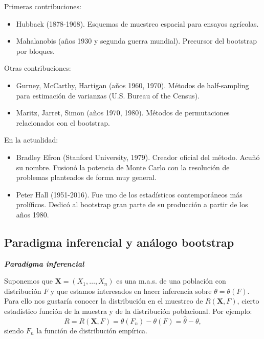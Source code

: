 \documentclass[]{book}
\theoremstyle{definition}
\theoremstyle{definition}
\theoremstyle{definition}
\theoremstyle{remark}
\begin{document}
Primeras contribuciones:

\begin{itemize}
\item
  Hubback (1878-1968). Esquemas de muestreo espacial para ensayos
  agrícolas.
\item
  Mahalanobis (años 1930 y segunda guerra mundial). Precursor del
  bootstrap por bloques.
\end{itemize}

Otras contribuciones:

\begin{itemize}
\item
  Gurney, McCarthy, Hartigan (años 1960, 1970). Métodos de half-sampling
  para estimación de varianzas (U.S. Bureau of the Census).
\item
  Maritz, Jarret, Simon (años 1970, 1980). Métodos de permutaciones
  relacionados con el bootstrap.
\end{itemize}

En la actualidad:

\begin{itemize}
\item
  Bradley Efron (Stanford University, 1979). Creador oficial del método.
  Acuñó su nombre. Fusionó la potencia de Monte Carlo con la resolución
  de problemas planteados de forma muy general.
\item
  Peter Hall (1951-2016). Fue uno de los estadísticos contemporáneos más
  prolíficos. Dedicó al bootstrap gran parte de su producción a partir
  de los años 1980.
\end{itemize}

\subsection{Paradigma inferencial y análogo
bootstrap}\label{paradigma-inferencial-y-analogo-bootstrap}

\textbf{\emph{Paradigma inferencial}}

Suponemos que \(\mathbf{X}=\left( X_1,\ldots ,X_n \right)\) es una
m.a.s. de una población con distribución \(F\) y que estamos interesados
en hacer inferencia sobre \(\theta =\theta \left(F \right)\). Para ello
nos gustaría conocer la distribución en el muestreo de
\(R\left( \mathbf{X},F \right)\), cierto estadístico función de la
muestra y de la distribución poblacional. Por ejemplo:
\[R=R\left( \mathbf{X},F \right) =\theta \left( F_n \right) 
-\theta \left( F \right) = \hat \theta - \theta,\] siendo \(F_n\) la
función de distribución empírica.
\end{document}
